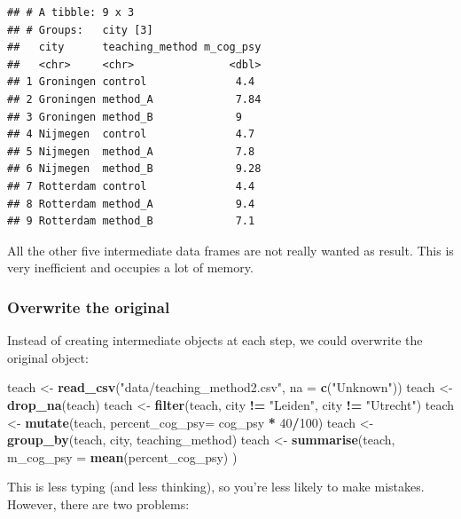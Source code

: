 \documentclass[
]{scrartcl}
\newenvironment{Shaded}{\begin{snugshade}}{\end{snugshade}}
\newcommand{\AttributeTok}[1]{\textcolor[rgb]{0.13,0.29,0.53}{#1}}
\newcommand{\DecValTok}[1]{\textcolor[rgb]{0.00,0.00,0.81}{#1}}
\newcommand{\FunctionTok}[1]{\textcolor[rgb]{0.13,0.29,0.53}{\textbf{#1}}}
\newcommand{\NormalTok}[1]{#1}
\newcommand{\OtherTok}[1]{\textcolor[rgb]{0.56,0.35,0.01}{#1}}
\newcommand{\SpecialCharTok}[1]{\textcolor[rgb]{0.81,0.36,0.00}{\textbf{#1}}}
\newcommand{\StringTok}[1]{\textcolor[rgb]{0.31,0.60,0.02}{#1}}
\begin{document}
\begin{verbatim}
## # A tibble: 9 x 3
## # Groups:   city [3]
##   city      teaching_method m_cog_psy
##   <chr>     <chr>               <dbl>
## 1 Groningen control              4.4 
## 2 Groningen method_A             7.84
## 3 Groningen method_B             9   
## 4 Nijmegen  control              4.7 
## 5 Nijmegen  method_A             7.8 
## 6 Nijmegen  method_B             9.28
## 7 Rotterdam control              4.4 
## 8 Rotterdam method_A             9.4 
## 9 Rotterdam method_B             7.1
\end{verbatim}

All the other five intermediate data frames are not really wanted as result. This is very inefficient and occupies a lot of memory.

\subsubsection{Overwrite the original}\label{overwrite-the-original}

Instead of creating intermediate objects at each step, we could overwrite the original object:

\begin{Shaded}
\begin{Highlighting}[]
\NormalTok{teach }\OtherTok{\textless{}{-}} \FunctionTok{read\_csv}\NormalTok{(}\StringTok{"data/teaching\_method2.csv"}\NormalTok{, }\AttributeTok{na =} \FunctionTok{c}\NormalTok{(}\StringTok{"Unknown"}\NormalTok{))}
\NormalTok{teach }\OtherTok{\textless{}{-}} \FunctionTok{drop\_na}\NormalTok{(teach)}
\NormalTok{teach }\OtherTok{\textless{}{-}} \FunctionTok{filter}\NormalTok{(teach, city }\SpecialCharTok{!=} \StringTok{"Leiden"}\NormalTok{, city }\SpecialCharTok{!=} \StringTok{"Utrecht"}\NormalTok{)}
\NormalTok{teach }\OtherTok{\textless{}{-}} \FunctionTok{mutate}\NormalTok{(teach, }\AttributeTok{percent\_cog\_psy=}\NormalTok{ cog\_psy }\SpecialCharTok{*} \DecValTok{40}\SpecialCharTok{/}\DecValTok{100}\NormalTok{)}
\NormalTok{teach }\OtherTok{\textless{}{-}} \FunctionTok{group\_by}\NormalTok{(teach, city, teaching\_method)}
\NormalTok{teach }\OtherTok{\textless{}{-}} \FunctionTok{summarise}\NormalTok{(teach, }\AttributeTok{m\_cog\_psy =} \FunctionTok{mean}\NormalTok{(percent\_cog\_psy) )}
\end{Highlighting}
\end{Shaded}

This is less typing (and less thinking), so you're less likely to make mistakes. However, there are two problems:
\end{document}
